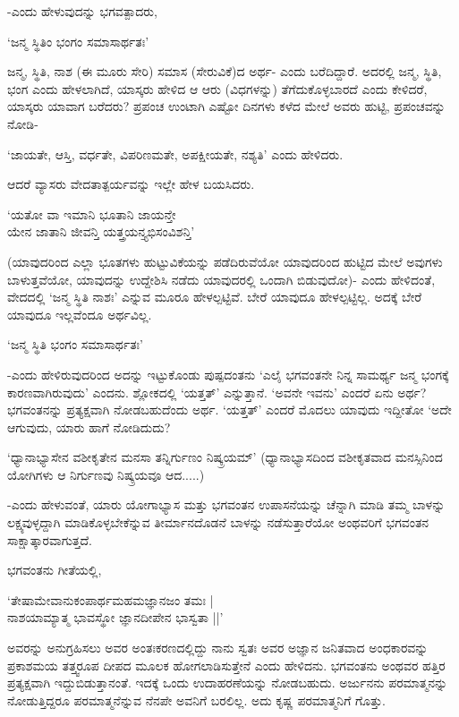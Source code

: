 -ಎಂದು ಹೇಳುವುದನ್ನು ಭಗವತ್ಪಾದರು,

\begin{shloka}
`ಜನ್ಮ ಸ್ಥಿತಿಂ ಭಂಗಂ ಸಮಾಸಾರ್ಥತಃ'
\end{shloka}

ಜನ್ಮ, ಸ್ಥಿತಿ, ನಾಶ (ಈ ಮೂರು ಸೇರಿ) ಸಮಾಸ (ಸೇರುವಿಕೆ)ದ ಅರ್ಥ- ಎಂದು ಬರೆದಿದ್ದಾರೆ. ಅದರಲ್ಲಿ ಜನ್ಮ, ಸ್ಥಿತಿ, ಭಂಗ ಎಂದು ಹೇಳಲಾಗಿದೆ, ಯಾಸ್ಕರು ಹೇಳಿದ ಆ ಆರು (ವಿಧಗಳನ್ನು) ತೆಗೆದುಕೊಳ್ಳಬಾರದೆ ಎಂದು ಕೇಳಿದರೆ, ಯಾಸ್ಕರು ಯಾವಾಗ ಬರೆದರು? ಪ್ರಪಂಚ ಉಂಟಾಗಿ ಎಷ್ಟೋ ದಿನಗಳು ಕಳೆದ ಮೇಲೆ ಅವರು ಹುಟ್ಟಿ, ಪ್ರಪಂಚವನ್ನು ನೋಡಿ-

`ಜಾಯತೇ, ಆಸ್ತಿ, ವರ್ಧತೇ, ವಿಪರಿಣಮತೇ, ಅಪಕ್ಷೀಯತೇ, ನಶ್ಯತಿ' ಎಂದು ಹೇಳಿದರು.

ಆದರೆ ವ್ಯಾಸರು ವೇದತಾತ್ಪರ್ಯವನ್ನು ಇಲ್ಲೇ ಹೇಳ ಬಯಸಿದರು.

\begin{shloka}
`ಯತೋ ವಾ ಇಮಾನಿ ಭೂತಾನಿ ಜಾಯನ್ತೇ\\
ಯೇನ ಜಾತಾನಿ ಜೀವನ್ತಿ ಯತ್ತ್ರಯನ್ತ್ಯಭಿಸಂವಿಶನ್ತಿ'
\end{shloka}

(ಯಾವುದರಿಂದ ಎಲ್ಲಾ ಭೂತಗಳು ಹುಟ್ಟುವಿಕೆಯನ್ನು ಪಡೆದಿರುವೆಯೋ ಯಾವುದರಿಂದ ಹುಟ್ಟಿದ ಮೇಲೆ ಅವುಗಳು ಬಾಳುತ್ತವೆಯೋ, ಯಾವುದನ್ನು ಉದ್ದೇಶಿಸಿ ನಡೆದು ಯಾವುದರಲ್ಲಿ ಒಂದಾಗಿ ಬಿಡುವುದೋ)- ಎಂದು ಹೇಳಿದಂತೆ, ವೇದದಲ್ಲಿ `ಜನ್ಮ ಸ್ಥಿತಿ ನಾಶಃ' ಎನ್ನುವ ಮೂರೂ ಹೇಳಲ್ಪಟ್ಟಿವೆ. ಬೇರೆ ಯಾವುದೂ ಹೇಳಲ್ಪಟ್ಟಿಲ್ಲ. ಅದಕ್ಕೆ ಬೇರೆ ಯಾವುದೂ ಇಲ್ಲವೆಂದೂ ಅರ್ಥವಿಲ್ಲ.

\begin{shloka}
`ಜನ್ಮ ಸ್ಥಿತಿ ಭಂಗಂ ಸಮಾಸಾರ್ಥತಃ'
\end{shloka}

-ಎಂದು ಹೇಳಿರುವುದರಿಂದ ಅದನ್ನು ಇಟ್ಟುಕೊಂಡು ಪುಷ್ಪದಂತನು `ಎಲೈ ಭಗವಂತನೇ ನಿನ್ನ ಸಾಮರ್ಥ್ಯ ಜನ್ಮ ಭಂಗಕ್ಕೆ ಕಾರಣವಾಗಿರುವುದು' ಎಂದನು. ಶ್ಲೋಕದಲ್ಲಿ `ಯತ್ತತ್' ಎನ್ನುತ್ತಾನೆ. `ಅವನೇ ಇವನು' ಎಂದರೆ ಏನು ಅರ್ಥ? ಭಗವಂತನನ್ನು ಪ್ರತ್ಯಕ್ಷವಾಗಿ ನೋಡಬಹುದೆಂದು ಅರ್ಥ. `ಯತ್ತತ್' ಎಂದರೆ ಮೊದಲು ಯಾವುದು ಇದ್ದೀತೋ `ಅದೇ ಆಗುವುದು, ಯಾರು ಹಾಗೆ ನೋಡಿದುದು?

`ಧ್ಯಾನಾಭ್ಯಾಸೇನ ವಶೀಕೃತೇನ ಮನಸಾ ತನ್ನಿರ್ಗುಣಂ ನಿಷ್ಕ್ರಯಮ್' (ಧ್ಯಾನಾಭ್ಯಾಸದಿಂದ ವಶೀಕೃತವಾದ ಮನಸ್ಸಿನಿಂದ ಯೋಗಿಗಳು ಆ ನಿರ್ಗುಣವು ನಿಷ್ಕ್ರಯವೂ ಆದ.....)

-ಎಂದು ಹೇಳುವಂತೆ, ಯಾರು ಯೋಗಾಭ್ಯಾಸ ಮತ್ತು ಭಗವಂತನ ಉಪಾಸನೆಯನ್ನು ಚೆನ್ನಾಗಿ ಮಾಡಿ ತಮ್ಮ ಬಾಳನ್ನು ಲಕ್ಷ್ಯವುಳ್ಳದ್ದಾಗಿ ಮಾಡಿಕೊಳ್ಳಬೇಕೆನ್ನುವ ತೀರ್ಮಾನದೊಡನೆ ಬಾಳನ್ನು ನಡೆಸುತ್ತಾರೆಯೋ ಅಂಥವರಿಗೆ ಭಗವಂತನ ಸಾಕ್ಷಾತ್ಕಾರವಾಗುತ್ತದೆ.

ಭಗವಂತನು ಗೀತೆಯಲ್ಲಿ,

\begin{shloka}
`ತೇಷಾಮೇವಾನುಕಂಪಾರ್ಥಮಹಮಜ್ಞಾನಜಂ ತಮಃ |\\
ನಾಶಯಾಮ್ಯಾತ್ಮ ಭಾವಸ್ಥೋ ಜ್ಞಾನದೀಪೇನ ಭಾಸ್ವತಾ ||'
\end{shloka}

ಅವರನ್ನು ಅನುಗ್ರಹಿಸಲು ಅವರ ಅಂತಃಕರಣದಲ್ಲಿದ್ದು ನಾನು ಸ್ವತಃ ಅವರ ಅಜ್ಞಾನ ಜನಿತವಾದ ಅಂಧಕಾರವನ್ನು ಪ್ರಕಾಶಮಯ ತತ್ತ್ವರೂಪ ದೀಪದ ಮೂಲಕ ಹೋಗಲಾಡಿಸುತ್ತೇನೆ ಎಂದು ಹೇಳಿದನು. ಭಗವಂತನು ಅಂಥವರ ಹತ್ತಿರ ಪ್ರತ್ಯಕ್ಷವಾಗಿ ಇದ್ದುಬಿಡುತ್ತಾನಂತೆ. ಇದಕ್ಕೆ ಒಂದು ಉದಾಹರಣೆಯನ್ನು ನೋಡಬಹುದು. ಅರ್ಜುನನು ಪರಮಾತ್ಮನನ್ನು ನೋಡುತ್ತಿದ್ದರೂ ಪರಮಾತ್ಮನೆನ್ನುವ ನೆನಪೇ ಅವನಿಗೆ ಬರಲಿಲ್ಲ. ಅದು ಕೃಷ್ಣ ಪರಮಾತ್ಮನಿಗೆ ಗೊತ್ತು.

